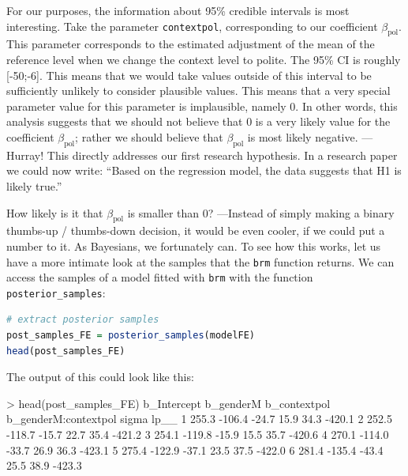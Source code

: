\documentclass[nobib]{tufte-handout}
\begin{document}
For our purposes, the information about 95\% credible intervals is most interesting. Take the parameter \texttt{contextpol}, corresponding to our coefficient $\beta_{\text{pol}}$. This parameter corresponds to the estimated adjustment of the mean of the reference level when we change the context level to polite. The 95\% CI is roughly [-50;-6]. This means that we would take values outside of this interval to be sufficiently unlikely to consider plausible values. This means that a very special parameter value for this parameter is implausible, namely 0. In other words, this analysis suggests that we should not believe that 0 is a very likely value for the coefficient $\beta_{\text{pol}}$; rather we should believe that $\beta_{\text{pol}}$ is most likely negative. --- Hurray! This directly addresses our first research hypothesis. In a research paper we could now write: ``Based on the regression model, the data suggests that H1 is likely true.''

How likely is it that $\beta_{\text{pol}}$ is smaller than 0? ---Instead of simply making a binary thumbs-up / thumbs-down decision, it would be even cooler, if we could put a number to it. As Bayesians, we fortunately can. To see how this works, let us have a more intimate look at the samples that the \texttt{brm} function returns. We can access the samples of a model fitted with \texttt{brm} with the function \texttt{posterior\_samples}:

\begin{minipage}[]{\textwidth}
\begin{lstlisting}[language=R]
# extract posterior samples 
post_samples_FE = posterior_samples(modelFE)
head(post_samples_FE)
\end{lstlisting}
\end{minipage}

The output of this could look like this:

\medskip

\begin{minipage}[]{1.2\textwidth}
\begin{rc}
> head(post_samples_FE)
  b_Intercept b_genderM b_contextpol b_genderM:contextpol    sigma      lp__
1    255.3 -106.4    -24.7             15.9 34.3 -420.1
2    252.5 -118.7    -15.7           22.7 35.4 -421.2
3    254.1 -119.8    -15.9            15.5 35.7 -420.6
4    270.1 -114.0    -33.7            26.9 36.3 -423.1
5    275.4 -122.9    -37.1           23.5 37.5 -422.0
6    281.4 -135.4    -43.4             25.5 38.9 -423.3
\end{rc}
\end{minipage}
\end{document}
